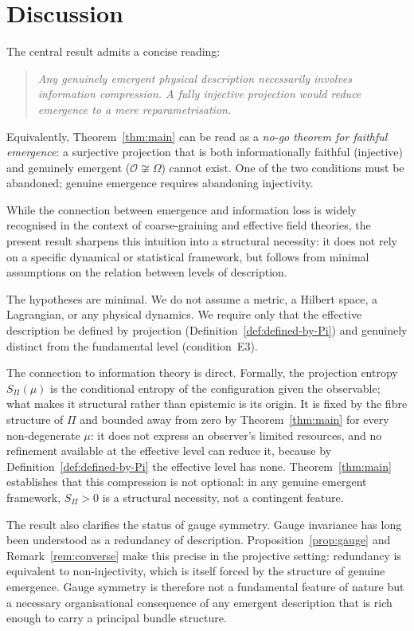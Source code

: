 \documentclass[12pt,a4paper]{article}
\begin{document}
  \section{Discussion}
  \label{sec:discussion}

  The central result admits a concise reading:
  \begin{quote}
    \emph{Any genuinely emergent physical description necessarily involves
    information compression.
    A fully injective projection would reduce emergence to a mere
    reparametrisation.}
  \end{quote}
  Equivalently, Theorem~\ref{thm:main} can be read as a \emph{no-go theorem
  for faithful emergence}: a surjective projection that is both
  informationally faithful (injective) and genuinely emergent
  ($\mathcal{O} \not\cong \Omega$) cannot exist.
  One of the two conditions must be abandoned; genuine emergence requires
  abandoning injectivity.

  While the connection between emergence and information loss is widely
  recognised in the context of coarse-graining and effective field
  theories, the present result sharpens this intuition into a structural
  necessity: it does not rely on a specific dynamical or statistical
  framework, but follows from minimal assumptions on the relation between
  levels of description.

  The hypotheses are minimal.
  We do not assume a metric, a Hilbert space, a Lagrangian, or any physical
  dynamics.
  We require only that the effective description be defined by projection
  (Definition~\ref{def:defined-by-Pi}) and genuinely distinct from the
  fundamental level (condition~E3).

  The connection to information theory is direct.
  Formally, the projection entropy $S_\Pi(\mu)$ is the conditional entropy of the configuration given the
  observable; what makes it structural rather than epistemic is its origin.
  It is fixed by the fibre structure of $\Pi$ and bounded away from zero by Theorem~\ref{thm:main} for every
  non-degenerate $\mu$: it does not express an observer's limited resources, and no refinement available at the
  effective level can reduce it, because by Definition~\ref{def:defined-by-Pi} the effective level has none.
  Theorem~\ref{thm:main} establishes that this compression is not optional: in
  any genuine emergent framework, $S_\Pi > 0$ is a structural necessity, not a
  contingent feature.

  The result also clarifies the status of gauge symmetry.
  Gauge invariance has long been understood as a redundancy of description.
  Proposition~\ref{prop:gauge} and Remark~\ref{rem:converse} make this precise
  in the projective setting: redundancy is equivalent to non-injectivity, which
  is itself forced by the structure of genuine emergence.
  Gauge symmetry is therefore not a fundamental feature of nature but a
  necessary organisational consequence of any emergent description that is rich
  enough to carry a principal bundle structure.
\end{document}
